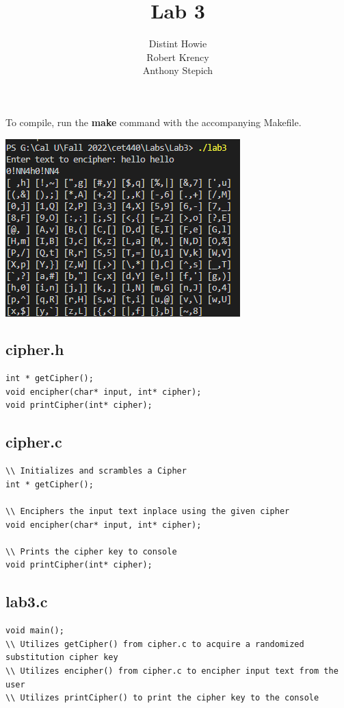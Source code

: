 \documentclass{article}
\date{}
\author{Distint Howie \\ Robert Krency \\ Anthony Stepich}
\title{Lab 3}
\begin{document}
\maketitle

To compile, run the \textbf{make} command with the accompanying Makefile.

\begin{center}
    \includegraphics{screenshot.png}    
\end{center}

\subsection*{cipher.h}

\begin{lstlisting}[style=CStyle]
int * getCipher(); 
void encipher(char* input, int* cipher);
void printCipher(int* cipher);
\end{lstlisting}


\subsection*{cipher.c}

\begin{lstlisting}[style=CStyle]
\\ Initializes and scrambles a Cipher
int * getCipher(); 

\\ Enciphers the input text inplace using the given cipher
void encipher(char* input, int* cipher);

\\ Prints the cipher key to console
void printCipher(int* cipher);
\end{lstlisting}


\subsection*{lab3.c}
\begin{lstlisting}[style=CStyle]
void main();
\\ Utilizes getCipher() from cipher.c to acquire a randomized substitution cipher key
\\ Utilizes encipher() from cipher.c to encipher input text from the user
\\ Utilizes printCipher() to print the cipher key to the console
\end{lstlisting}
\end{document}
